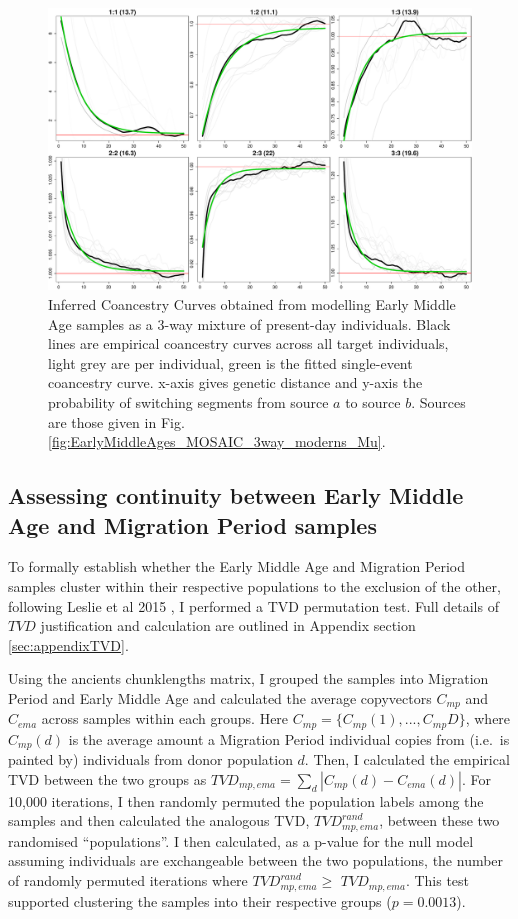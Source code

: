\begin{figure}[htp]
    \centering
    \includegraphics[width=1.0\textwidth]{../images/chapter5/EarlyMiddleAges_3way_acoanc.pdf}
    \caption{Inferred Coancestry Curves obtained from modelling Early Middle Age samples as a 3-way mixture of present-day individuals. Black lines are empirical coancestry curves across all target individuals, light grey are per individual, green is the fitted single-event coancestry curve. x-axis gives genetic distance and y-axis the probability of switching segments from source $a$ to source $b$. Sources are those given in Fig. \ref{fig:EarlyMiddleAges_MOSAIC_3way_moderns_Mu}.}
    \label{fig:EarlyMiddleAges_MOSAIC_3way_moderns_acoanc}
\end{figure}


\subsection{Assessing continuity between Early Middle Age and Migration Period samples} \label{sec:TVD_test}

To formally establish whether the Early Middle Age and Migration Period samples cluster within their respective populations to the exclusion of the other, following Leslie et al 2015 \cite{Leslie2015}, I performed a TVD permutation test. Full details of $TVD$ justification and calculation are outlined in Appendix section \ref{sec:appendixTVD}.

Using the ancients chunklengths matrix, I grouped the samples into Migration Period and Early Middle Age and calculated the average copyvectors $C_{mp}$ and $C_{ema}$ across samples within each groups. Here $C_{mp}=\{C_{mp}(1),...,C_{mp}{D}\}$, where $C_{mp}(d)$ is the average amount a Migration Period individual copies from (i.e.\ is painted by) individuals from donor population $d$. Then, I calculated the empirical TVD between the two groups as $TVD_{mp,ema} = \sum_d |C_{mp}(d) - C_{ema}(d)|$. For 10,000 iterations, I then randomly permuted the population labels among the samples and then calculated the analogous TVD, $TVD_{mp,ema}^{rand}$, between these two randomised ``populations''. I then calculated, as a p-value for the null model assuming individuals are exchangeable between the two populations, the number of randomly permuted iterations where $TVD_{mp,ema}^{rand} \geq $ $TVD_{mp,ema}$. This test supported clustering the samples into their respective groups ($p=0.0013$).

